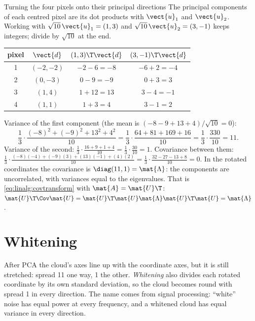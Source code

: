 \begin{worked}[label={we:linalg:pcacoords}]{Turning the four pixels onto their principal directions}
The principal components of each centred pixel are its dot products with $\vect{u}_1$ and
$\vect{u}_2$. Working with $\sqrt{10}\,\vect{u}_1 = (1, 3)$ and $\sqrt{10}\,\vect{u}_2 = (3, -1)$
keeps integers; divide by $\sqrt{10}$ at the end.
\begin{center}
\begin{tabular}{cccc}
\toprule
pixel & $\vect{d}$ & $(1,3)\T\vect{d}$ & $(3,-1)\T\vect{d}$\\
\midrule
1 & $(-2, -2)$ & $-2 - 6 = -8$  & $-6 + 2 = -4$\\
2 & $(0, -3)$  & $0 - 9 = -9$   & $0 + 3 = 3$\\
3 & $(1, 4)$   & $1 + 12 = 13$  & $3 - 4 = -1$\\
4 & $(1, 1)$   & $1 + 3 = 4$    & $3 - 1 = 2$\\
\bottomrule
\end{tabular}
\end{center}
Variance of the first component (the mean is $(-8-9+13+4)/\sqrt{10} = 0$):
\[
\frac{1}{3}\cdot\frac{(-8)^2 + (-9)^2 + 13^2 + 4^2}{10}
= \frac{1}{3}\cdot\frac{64 + 81 + 169 + 16}{10} = \frac{1}{3}\cdot\frac{330}{10} = 11 .
\]
Variance of the second:
$\frac{1}{3}\cdot\frac{16 + 9 + 1 + 4}{10} = \frac13\cdot\frac{30}{10} = 1$.
Covariance between them:
$\frac{1}{3}\cdot\frac{(-8)(-4) + (-9)(3) + (13)(-1) + (4)(2)}{10}
= \frac13\cdot\frac{32 - 27 - 13 + 8}{10} = 0$.
In the rotated coordinates the covariance is $\diag(11, 1) = \mat{\Lambda}$: the components are
uncorrelated, with variances equal to the eigenvalues. That is \cref{eq:linalg:covtransform}
with $\mat{A} = \mat{U}\T$: $\mat{U}\T\Cov\mat{U} = \mat{U}\T\mat{U}\mat{\Lambda}\mat{U}\T\mat{U}
= \mat{\Lambda}$.
\end{worked}

\section{Whitening}\label{sec:linalg:whitening}

After PCA the cloud's axes line up with the coordinate axes, but it is still stretched: spread
11 one way, 1 the other. \emph{Whitening} also divides each rotated coordinate by
its own standard deviation, so the cloud becomes round with spread 1 in every direction. The
name comes from signal processing: ``white'' noise has equal power at every frequency, and a
whitened cloud has equal variance in every direction.

